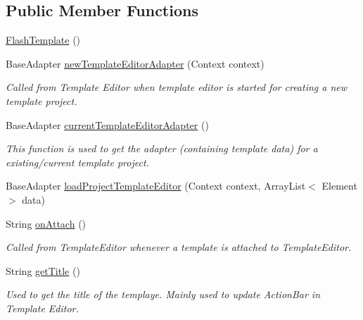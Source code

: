 \subsection*{Public Member Functions}
\begin{DoxyCompactItemize}
\item 
\hyperlink{classorg_1_1buildmlearn_1_1toolkit_1_1templates_1_1FlashTemplate_a93eca3908cf039e1fa37e0408d0f4837}{Flash\-Template} ()
\item 
Base\-Adapter \hyperlink{classorg_1_1buildmlearn_1_1toolkit_1_1templates_1_1FlashTemplate_ad524e69199d8435959cf348558039b2d}{new\-Template\-Editor\-Adapter} (Context context)
\begin{DoxyCompactList}\small\item\em Called from Template Editor when template editor is started for creating a new template project. \end{DoxyCompactList}\item 
Base\-Adapter \hyperlink{classorg_1_1buildmlearn_1_1toolkit_1_1templates_1_1FlashTemplate_a70db96b6e7ec5e339fe106fc15d64860}{current\-Template\-Editor\-Adapter} ()
\begin{DoxyCompactList}\small\item\em This function is used to get the adapter (containing template data) for a existing/current template project. \end{DoxyCompactList}\item 
Base\-Adapter \hyperlink{classorg_1_1buildmlearn_1_1toolkit_1_1templates_1_1FlashTemplate_aeee0f28447c5d3c1d5c7c4ef8bb2ae3e}{load\-Project\-Template\-Editor} (Context context, Array\-List$<$ Element $>$ data)
\item 
String \hyperlink{classorg_1_1buildmlearn_1_1toolkit_1_1templates_1_1FlashTemplate_ada55d7e95306576dd3a2f30183c3fc1e}{on\-Attach} ()
\begin{DoxyCompactList}\small\item\em Called from Template\-Editor whenever a template is attached to Template\-Editor. \end{DoxyCompactList}\item 
String \hyperlink{classorg_1_1buildmlearn_1_1toolkit_1_1templates_1_1FlashTemplate_aed263c384b73d5d700e4144a97007245}{get\-Title} ()
\begin{DoxyCompactList}\small\item\em Used to get the title of the templaye. Mainly used to update Action\-Bar in Template Editor. \end{DoxyCompactList}\item 

\end{DoxyCompactItemize}
